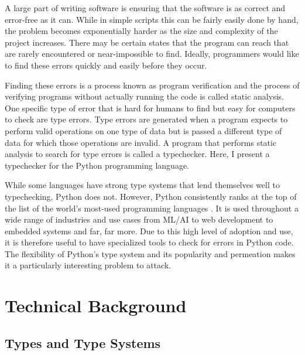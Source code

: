 \documentclass[10pt,twocolumn]{article}
\begin{document}
A large part of writing software is ensuring that the software is as correct and error-free as it can. While in simple scripts this can be fairly easily done by hand, the problem becomes exponentially harder as the size and complexity of the project increases. There may be certain states that the program can reach that are rarely encountered or near-impossible to find. Ideally, programmers would like to find these errors quickly and easily before they occur. 

Finding these errors is a process known as program verification and the process of verifying programs without actually running the code is called static analysis. One specific type of error that is hard for humans to find but easy for computers to check are type errors. Type errors are generated when a program expects to perform valid operations on one type of data but is passed a different type of data for which those operations are invalid. A program that performs static analysis to search for type errors is called a typechecker. Here, I present a typechecker for the Python programming language.

While some languages have strong type systems that lend themselves well to typechecking, Python does not. However, Python consistently ranks at the top of the list of the world's most-used programming languages \cite{noauthor_tiobe_nodate}. It is used throughout a wide range of industries and use cases from ML/AI to web development to embedded systems and far, far more. Due to this high level of adoption and use, it is therefore useful to have specialized tools to check for errors in Python code. The flexibility of Python's type system and its popularity and permeation makes it a particularly interesting problem to attack.

\section{Technical Background}

\subsection{Types and Type Systems}
\end{document}
